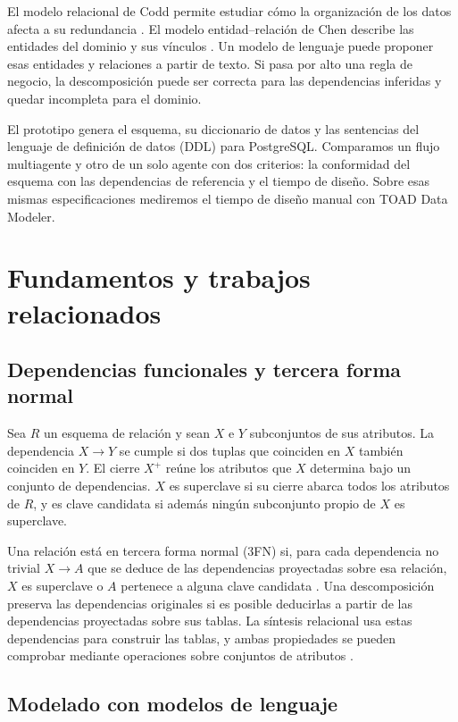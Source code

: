 \documentclass[conference]{IEEEtran}
\begin{document}
El modelo relacional de Codd permite estudiar cómo la organización de los datos afecta a su redundancia \cite{codd1970,codd1971}. El modelo entidad--relación de Chen describe las entidades del dominio y sus vínculos \cite{chen1976}. Un modelo de lenguaje puede proponer esas entidades y relaciones a partir de texto. Si pasa por alto una regla de negocio, la descomposición puede ser correcta para las dependencias inferidas y quedar incompleta para el dominio.

El prototipo genera el esquema, su diccionario de datos y las sentencias del lenguaje de definición de datos (DDL) para PostgreSQL. Comparamos un flujo multiagente y otro de un solo agente con dos criterios: la conformidad del esquema con las dependencias de referencia y el tiempo de diseño. Sobre esas mismas especificaciones mediremos el tiempo de diseño manual con TOAD Data Modeler.

\section{Fundamentos y trabajos relacionados}

\subsection{Dependencias funcionales y tercera forma normal}

Sea $R$ un esquema de relación y sean $X$ e $Y$ subconjuntos de sus atributos. La dependencia $X\to Y$ se cumple si dos tuplas que coinciden en $X$ también coinciden en $Y$. El cierre $X^{+}$ reúne los atributos que $X$ determina bajo un conjunto de dependencias. $X$ es superclave si su cierre abarca todos los atributos de $R$, y es clave candidata si además ningún subconjunto propio de $X$ es superclave.

Una relación está en tercera forma normal (3FN) si, para cada dependencia no trivial $X\to A$ que se deduce de las dependencias proyectadas sobre esa relación, $X$ es superclave o $A$ pertenece a alguna clave candidata \cite{codd1971,bernstein1976}. Una descomposición preserva las dependencias originales si es posible deducirlas a partir de las dependencias proyectadas sobre sus tablas. La síntesis relacional usa estas dependencias para construir las tablas, y ambas propiedades se pueden comprobar mediante operaciones sobre conjuntos de atributos \cite{bernstein1976}.

\subsection{Modelado con modelos de lenguaje}
\end{document}
